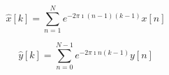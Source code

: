 \documentclass[letterpaper,12pt]{article}
\begin{document}
\begin{equation}
  \hat x[k] = \sum_{n=1}^N e^{-2\pi\imath (n-1)(k-1)} x[n]
\end{equation}

\begin{equation}
  \hat y[k] = \sum_{n=0}^{N-1} e^{-2\pi\imath n(k-1)} y[n]
\end{equation}
\end{document}
